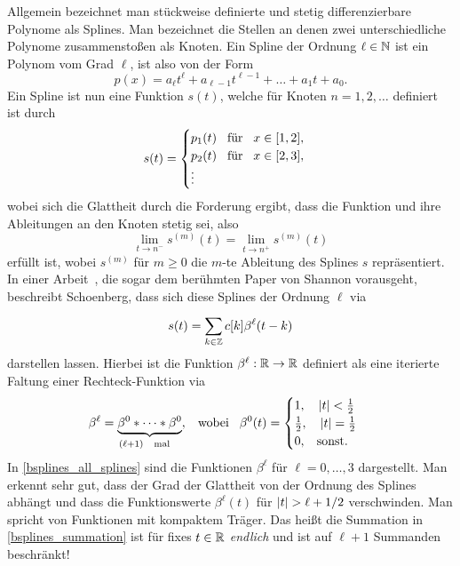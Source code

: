 Allgemein bezeichnet man st\"uckweise definierte und stetig differenzierbare Polynome als Splines. Man bezeichnet die Stellen an denen zwei unterschiedliche Polynome zusammensto{\ss}en als Knoten. Ein Spline der Ordnung $\ell \in \mathbb{N}$ ist ein Polynom vom Grad $\ell$, ist also von der Form
\begin{equation}
    p(x) = 
        a_{\ell} t^{\ell} 
        + a_{\ell - 1} t^{\ell-1} 
        + \dots
        + a_1 t 
        + a_{0}.
\end{equation}
%
Ein Spline ist nun eine Funktion $s(t)$, welche f\"ur Knoten $n = 1, 2, \dots$ definiert ist durch
\begin{equation}
    s(t) = \begin{cases}
        p_1(t) {\hspace{3mm} \text{f\"ur} \hspace{3mm}} x \in [1,2], \\
        p_2(t) {\hspace{3mm} \text{f\"ur} \hspace{3mm}} x \in [2,3], \\
        \vdots
    \end{cases}
\end{equation}
wobei sich die Glattheit durch die Forderung ergibt, dass die Funktion und ihre Ableitungen an den Knoten stetig sei, also
\begin{equation}
    \lim\limits_{t \rightarrow n^-} s^{(m)}(t) =
    \lim\limits_{t \rightarrow n^+} s^{(m)}(t)
\end{equation}
erf\"ullt ist, wobei $s^{(m)}$ f\"ur $m \geqslant 0$ die $m$-te Ableitung des Splines $s$ repr\"asentiert. In einer Arbeit~\cite{schoenberg1988bsplines}, die sogar dem ber\"uhmten Paper von Shannon vorausgeht, beschreibt Schoenberg, dass sich diese Splines der Ordnung $\ell$ via
\begin{equation}\label{bsplines_summation}
    s(t) = {\sum\limits_{k \in \mathbb{Z}}^{}{
        c[k] \beta^{\ell}(t - k)
    }}
\end{equation}
darstellen lassen. Hierbei ist die Funktion $\beta^\ell: \mathbb{R} \rightarrow \mathbb{R}$ definiert als eine iterierte Faltung einer Rechteck-Funktion via
\begin{equation}
    \beta^\ell = \underbrace{
        \beta^0 \ast \dots \ast \beta^0
    }_{(\ell+1) {\hspace{3mm} \text{mal} \hspace{3mm}}}, 
    {\hspace{3mm} \text{wobei} \hspace{3mm}}
    \beta^0(t) = \begin{cases}
        1,\quad {\left| t \right|} < \frac{1}{2} \\
        \frac{1}{2}, \quad {\left| t \right|} = \frac{1}{2} \\
        0, {\hspace{3mm} \text{sonst.} \hspace{3mm}}
    \end{cases}
\end{equation}
In \cref{bsplines_all_splines} sind die Funktionen $\beta^\ell$ f\"ur $\ell = 0, \dots, 3$ dargestellt. Man erkennt sehr gut, dass der Grad der Glattheit von der Ordnung des Splines abh\"angt und dass die Funktionswerte $\beta^\ell(t)$ f\"ur ${\left| t \right|}>\ell+1/2$ verschwinden. Man spricht von Funktionen mit kompaktem Tr\"ager. Das hei{\ss}t die Summation in \eqref{bsplines_summation} ist f\"ur fixes $t \in \mathbb{R}$ \emph{endlich} und ist auf $\ell+1$ Summanden beschr\"ankt!
